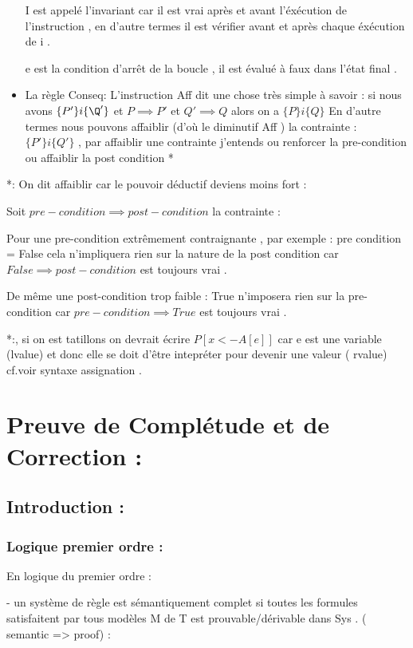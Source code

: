 \documentclass{article}
\begin{document}
\begin{itemize}
      I est appelé l'invariant car il est vrai après et avant l'éxécution de l'instruction , en d'autre termes il est vérifier avant et après chaque éxécution de i .
      
      e est la condition d'arrêt de la boucle , il est évalué à faux dans l'état final .
      
      \item La règle Conseq:
      L'instruction Aff  dit une chose très simple à savoir : si nous avons $\{P'\}i\{\Q'\}$ et $P\implies P'$ et $Q' \implies Q $ alors on a $\{P\}i\{Q\}$  
      En d'autre termes nous pouvons affaiblir (d'où le diminutif Aff ) la contrainte : $\{P'\}i\{Q'\}$ , par affaiblir une contrainte j'entends ou renforcer la pre-condition ou affaiblir la post condition *
      \end{itemize}
      
      
      *: On dit affaiblir car le pouvoir déductif deviens moins fort :
      
      Soit $pre-condition \implies post-condition$ la contrainte :
      
      Pour une pre-condition extrêmement contraignante , par exemple : pre condition = False cela n'impliquera rien sur la nature de la  post condition car $False \implies post-condition$ est toujours vrai .
      
      De même une post-condition trop faible : True n'imposera rien sur la pre-condition car $pre-condition \implies True$ est toujours vrai . 
 
    *:, si on est tatillons on devrait écrire $P[x<- A[e] ]$ car e est une variable (lvalue) et donc elle se doit d'être intepréter pour devenir une valeur ( rvalue) cf.voir syntaxe assignation .

\section{ Preuve de Complétude et de Correction :}

\subsection{Introduction :  }

\subsubsection{Logique premier ordre :} 
En logique du premier ordre :

- un système de règle est sémantiquement complet si  toutes les formules satisfaitent par tous modèles M  de T est prouvable/dérivable dans Sys . ( semantic => proof) :
\end{document}
